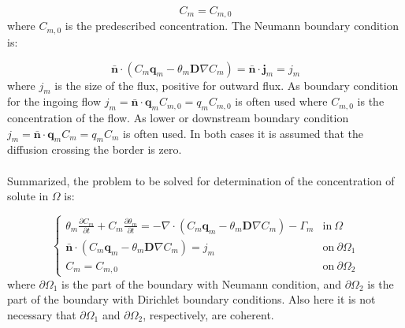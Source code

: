 \documentclass{report}
\begin{document}
\begin{equation}
C_{m}=C_{m,0} \label{eq:Dirichlet_sol}
\end{equation}
%
where $C_{m,0}$ is the predescribed concentration. The Neumann
boundary condition is:

\begin{equation}
 \mathbf{\bar{n}}\cdot (C_{m}\mathbf{q}_{m}-\theta_{m}\mathbf{D}\nabla
 C_{m})=\mathbf{\bar{n}}\cdot \mathbf{j}_{m}=j_{m}
\label{eq:Neumann_sol}
\end{equation}
%
where $j_{m}$ is the size of the flux, positive for outward flux. As
boundary condition for the ingoing flow
$j_{m}=\mathbf{\bar{n}}\cdot\mathbf{q}_{m}C_{m,0}=q_{m}C_{m,0}$ is
often used where $C_{m,0}$ is the concentration of the flow. As
lower or downstream boundary condition
$j_{m}=\mathbf{\bar{n}}\cdot\mathbf{q}_{m}C_{m}=q_{m}C_{m}$ is often
used. In both cases it is assumed that the diffusion crossing the border is zero.\\
\\
Summarized, the problem to be solved for determination of the
concentration of solute in $\Omega$ is:

\begin{equation}
\begin{cases}
 \theta_{m} \frac{\partial C_{m}}{\partial t} + C_{m} \frac{\partial
  \theta_{m}}{\partial t} =  -\nabla \cdot(C_{m}
  \mathbf{q}_{m}-\theta_{m}
  \mathbf{D}\nabla C_{m})- \Gamma_{m} &
  \text{in} \ \Omega \\
 \mathbf{\bar{n}}\cdot (C_{m}\mathbf{q}_{m}-\theta_{m}\mathbf{D}\nabla C_{m})=j_{m} &
  \text{on}\  \partial\Omega_1 \\
 C_{m}=C_{m,0} & \text{on}\ \partial\Omega_2
\end{cases}
\label{eq:solutemovement}
\end{equation}
%
where $\partial \Omega_1$ is the part of the boundary with Neumann
condition, and $\partial \Omega_2$ is the part of the boundary with
Dirichlet boundary conditions. Also here it is not necessary that
$\partial \Omega_1$ and $\partial \Omega_2$, respectively, are
coherent.
\end{document}
